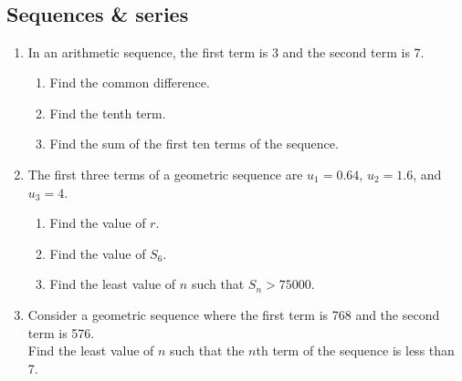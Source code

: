 \documentclass[12pt, oneside]{article}
\begin{document}
\subsection*{\\Sequences \& series}


\begin{enumerate}


\item In an arithmetic sequence, the first term is 3 and the second term is 7.
\begin{enumerate}
    \item Find the common difference.
        \begin{flushright}[2]\end{flushright}
    \item Find the tenth term.
        \begin{flushright}[2]\end{flushright}
    \item Find the sum of the first ten terms of the sequence. 
        \begin{flushright}[2]\end{flushright}
\end{enumerate}

\item The first three terms of a geometric sequence are $u_1=0.64$, $u_2=1.6$, and $u_3=4$.
\begin{enumerate}
    \item Find the value of $r$.
        \begin{flushright}[2]\end{flushright}
    \item Find the value of $S_6$.
        \begin{flushright}[2]\end{flushright}
    \item Find the least value of $n$
such that $S_n>75000$. 
        \begin{flushright}[3]\end{flushright}
\end{enumerate}

\item Consider a geometric sequence where the first term is 768 and the second term is 576.\\
Find the least value of $n$ such that the $n$th term of the sequence is less than 7.
    \begin{flushright}[6]\end{flushright}


\end{enumerate}
\end{document}
